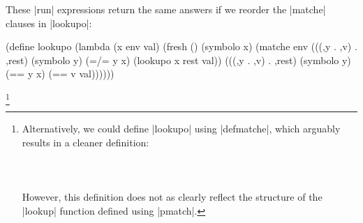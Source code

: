 These \scheme|run| expressions return the same answers if we reorder the \scheme|matche| clauses in \scheme|lookupo|:

\begin{schemedisplay}
(define lookupo
  (lambda (x env val)
    (fresh ()
      (symbolo x)
      (matche env
        (((,y . ,v) . ,rest) (symbolo y)
         (=/= y x) (lookupo x rest val))
        (((,y . ,v) . ,rest) (symbolo y)
         (== y x) (== v val))))))
\end{schemedisplay}




\setbox\boxa{}

\footnote{Alternatively, we could define \scheme|lookupo| using \scheme|defmatche|, which arguably results in a cleaner definition: \\ \ \\ \usebox{\boxa} \\ \ \\ However, this definition does not as clearly reflect the structure of the \scheme|lookup| function defined using \scheme|pmatch|.}
